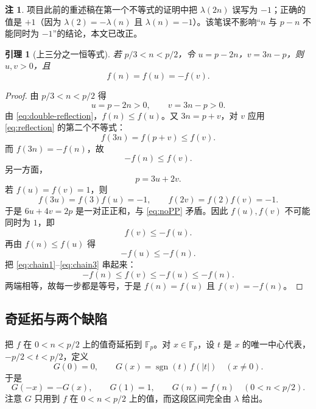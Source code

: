\documentclass[11pt,a4paper]{ctexart}
\theoremstyle{plain}
\newtheorem{lemma}[theorem]{引理}
\theoremstyle{definition}
\newtheorem{remark}[theorem]{注}
\newcommand{\Fp}{\mathbb{F}_p}
\newcommand{\li}{\lambda}
\newcommand{\sgn}{\operatorname{sgn}}
\begin{document}
\begin{remark}
项目此前的重述稿在第一个不等式的证明中把 $\li(2n)$ 误写为 $-1$；正确的值是 $+1$（因为 $\li(2)=-\li(n)$ 且 $\li(n)=-1$）。该笔误不影响“$n$ 与 $p-n$ 不能同时为 $-1$”的结论，本文已改正。
\end{remark}

\begin{lemma}[上三分之一恒等式]
\label{lem:upper}
若 $p/3<n<p/2$，令 $u=p-2n$，$v=3n-p$，则 $u,v>0$，且
\begin{equation}
  f(n)=f(u)=-f(v).
  \label{eq:upper}
\end{equation}
\end{lemma}

\begin{proof}
由 $p/3<n<p/2$ 得
\[
  u=p-2n>0,\qquad v=3n-p>0.
\]
由 \eqref{eq:double-reflection}，$f(n)\le f(u)$。又 $3n=p+v$，对 $v$ 应用 \eqref{eq:reflection} 的第二个不等式：
\[
  f(3n)=f(p+v)\le f(v).
\]
而 $f(3n)=-f(n)$，故
\begin{equation}
  -f(n)\le f(v).
  \label{eq:chain1}
\end{equation}
另一方面，
\[
  p=3u+2v.
\]
若 $f(u)=f(v)=1$，则
\[
  f(3u)=f(3)f(u)=-1,\qquad f(2v)=f(2)f(v)=-1.
\]
于是 $6u+4v=2p$ 是一对正正和，与 \eqref{eq:noPP} 矛盾。因此 $f(u),f(v)$ 不可能同时为 $1$，即
\begin{equation}
  f(v)\le -f(u).
  \label{eq:chain2}
\end{equation}
再由 $f(n)\le f(u)$ 得
\begin{equation}
  -f(u)\le -f(n).
  \label{eq:chain3}
\end{equation}
把 \eqref{eq:chain1}--\eqref{eq:chain3} 串起来：
\[
  -f(n)\le f(v)\le -f(u)\le -f(n).
\]
两端相等，故每一步都是等号，于是 $f(n)=f(u)$ 且 $f(v)=-f(n)$。
\end{proof}

\subsection{奇延拓与两个缺陷}
\label{sec:completion}
\label{sec:support}

把 $f$ 在 $0<n<p/2$ 上的值奇延拓到 $\Fp$。对 $x\in\Fp$，设 $t$ 是 $x$ 的唯一中心代表，$-p/2<t<p/2$，定义
\begin{equation}
  G(0)=0,\qquad G(x)=\sgn(t)\,f(|t|)\quad(x\ne0).
  \label{eq:completion}
\end{equation}
于是
\begin{equation}
  G(-x)=-G(x),\qquad G(1)=1,\qquad G(n)=f(n)\quad(0<n<p/2).
  \label{eq:G-properties}
\end{equation}
注意 $G$ 只用到 $f$ 在 $0<n<p/2$ 上的值，而这段区间完全由 $\li$ 给出。
\end{document}
